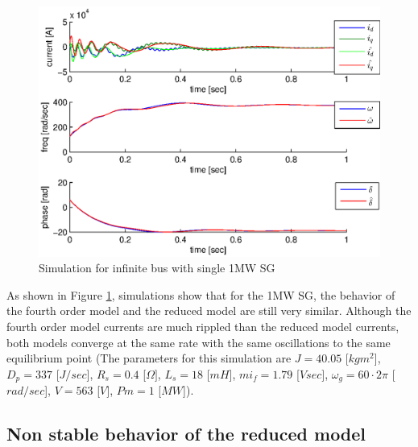 \documentclass[conference]{IEEEtran}
\begin{document}
\begin{figure}[h]
\includegraphics[scale=0.5]{sim1MWInfBus}

\caption{Simulation for infinite bus with single 1MW SG}
\label{fig:InfBusOne1MWSG}
\end{figure}

As shown in Figure \ref{fig:InfBusOne1MWSG}, simulations show that
for the 1MW SG, the behavior of the fourth order model and the reduced
model are still very similar. Although the fourth order model currents
are much rippled than the reduced model currents, both models converge
at the same rate with the same oscillations to the same equilibrium
point (The parameters for this simulation are $J=40.05$ {[}$kgm^{2}${]},
$D_{p}=337$ {[}$J/sec${]}, $R_{s}=0.4$ {[}$\Omega]$, $L_{s}=18$
{[}$mH${]}, $mi_{f}=1.79$ {[}$Vsec]$, $\omega_{g}=60\cdotp2\pi$
{[}$rad/sec${]}, $V=563$ {[}$V]$, $Pm=1$ {[}$MW${]}). 

\subsection{Non stable behavior of the reduced model}
\end{document}
